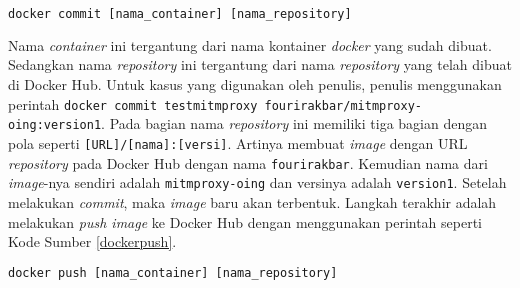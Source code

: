	\begin{minipage}{\linewidth}
	\begin{lstlisting}[caption=Perintah untuk \textit{Commit} Kontainer \textit{Docker},language=Python,label=dockercommit]
	docker commit [nama_container] [nama_repository]
	\end{lstlisting}
	\end{minipage}
    Nama \textit{container} ini tergantung dari nama kontainer \textit{docker} yang sudah dibuat. Sedangkan nama \textit{repository} ini tergantung dari nama \textit{repository} yang telah dibuat di Docker Hub. Untuk kasus yang digunakan oleh penulis, penulis menggunakan perintah \texttt{docker commit testmitmproxy fourirakbar/mitmproxy-oing:version1}. Pada bagian nama \textit{repository} ini memiliki tiga bagian dengan pola seperti \texttt{[URL]/[nama]:[versi]}. Artinya membuat \textit{image} dengan URL \textit{repository} pada Docker Hub dengan nama \texttt{fourirakbar}. Kemudian nama dari \textit{image}-nya sendiri adalah \texttt{mitmproxy-oing} dan versinya adalah \texttt{version1}. Setelah melakukan \textit{commit}, maka \textit{image} baru akan terbentuk. Langkah terakhir adalah melakukan \textit{push image} ke Docker Hub dengan menggunakan perintah seperti Kode Sumber \ref{dockerpush}.
    \newline
    \begin{minipage}{\linewidth}
   	\begin{lstlisting}[caption=Perintah untuk \textit{Push Image} ke Docker Hub,language=Python,label=dockerpush]
  docker push [nama_container] [nama_repository]
   	\end{lstlisting}
    \end{minipage}
    
